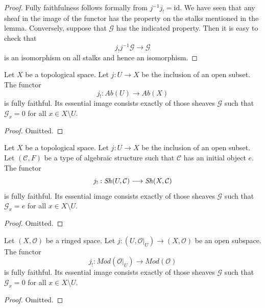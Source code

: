 \begin{proof}
Fully faithfulness follows formally from $j^{-1} j_! = \text{id}$.
We have seen that any sheaf in the image of the functor has
the property on the stalks mentioned in the lemma. Conversely, suppose
that $\mathcal{G}$ has the indicated property.
Then it is easy to check that
$$
j_! j^{-1} \mathcal{G} \to \mathcal{G}
$$
is an isomorphism on all stalks and hence an isomorphism.
\end{proof}

\begin{lemma}
\label{lemma-equivalence-categories-open-abelian}
Let $X$ be a topological space.
Let $j : U \to X$ be the inclusion of an open subset.
The functor
$$
j_! : \textit{Ab}(U) \longrightarrow \textit{Ab}(X)
$$
is fully faithful. Its essential image consists exactly
of those sheaves $\mathcal{G}$ such that
$\mathcal{G}_x = 0$ for all $x \in X \setminus U$.
\end{lemma}

\begin{proof}
Omitted.
\end{proof}

\begin{lemma}
\label{lemma-equivalence-categories-open-structures}
Let $X$ be a topological space.
Let $j : U \to X$ be the inclusion of an open subset.
Let $(\mathcal{C}, F)$ be a type of algebraic structure
such that $\mathcal{C}$ has an initial object $e$.
The functor
$$
j_! : \mathop{\mathit{Sh}}\nolimits(U, \mathcal{C}) \longrightarrow \mathop{\mathit{Sh}}\nolimits(X, \mathcal{C})
$$
is fully faithful. Its essential image consists exactly
of those sheaves $\mathcal{G}$ such that
$\mathcal{G}_x = e$ for all $x \in X \setminus U$.
\end{lemma}

\begin{proof}
Omitted.
\end{proof}


\begin{lemma}
\label{lemma-equivalence-categories-open-modules}
Let $(X, \mathcal{O})$ be a ringed space.
Let $j : (U, \mathcal{O}|_U) \to (X, \mathcal{O})$
be an open subspace.
The functor
$$
j_! : \textit{Mod}(\mathcal{O}|_U) \longrightarrow \textit{Mod}(\mathcal{O})
$$
is fully faithful. Its essential image consists exactly
of those sheaves $\mathcal{G}$ such that
$\mathcal{G}_x = 0$ for all $x \in X \setminus U$.
\end{lemma}

\begin{proof}
Omitted.
\end{proof}

